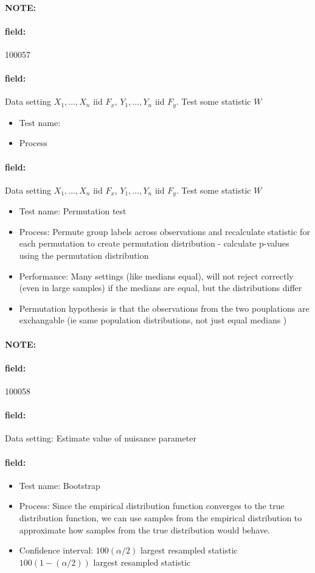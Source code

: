 \documentclass[12pt]{article}
\newenvironment{note}{\paragraph{NOTE:}}{}
\newenvironment{field}{\paragraph{field:}}{}
\begin{document}
\begin{note} \begin{field} \tiny 100057 \end{field}
 \begin{field}
  Data setting $X_1, \ldots , X_n$ iid $F_x$, $Y_1, \ldots, Y_n$ iid $F_y$. Test some statistic $W$
  \begin{itemize}
   \item Test name:
   \item Process
  \end{itemize}
 \end{field}
 \begin{field}
  Data setting $X_1, \ldots , X_n$ iid $F_x$, $Y_1, \ldots, Y_n$ iid $F_y$. Test some statistic $W$
  \begin{itemize}
   \item Test name: Permutation test
   \item Process: Permute group labels across observations and recalculate statistic for each permutation to create permutation distribution - calculate p-values using the permutation distribution
   \item Performance: Many settings (like medians equal), will not reject correctly (even in large samples) if the medians are equal, but the distributions differ
   \item Permutation hypothesis is that the observations from the two pouplations are exchangable (ie same population distributions, not just equal medians )
  \end{itemize}
 \end{field}
\end{note}


\begin{note} \begin{field} \tiny 100058 \end{field}
 \begin{field}
  Data setting: Estimate value of nuisance parameter
 \end{field}
 \begin{field}
  \begin{itemize}
   \item Test name: Bootstrap
   \item Process: Since the empirical distribution function converges to the true distribution function, we can use samples from the empirical distribution to approximate how samples from the true distribution would behave.
   \item Confidence interval: $100 (\alpha/2)$ largest resampled statistic $100(1 - (\alpha/2))$ largest resampled statistic
  \end{itemize}
 \end{field}
\end{note}
\end{document}
